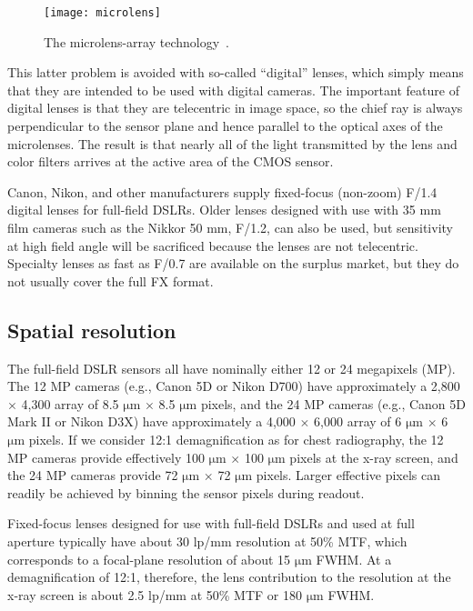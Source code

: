 \begin{figure}[h]
\centering
\texttt{[image: microlens]}
\caption{The microlens-array technology~\citep{microlensfig}.}
\label{fig:microlensarray}
\end{figure}

This latter problem is avoided with so-called ``digital'' lenses, which simply means that they are intended to be used with digital cameras. The important feature of digital lenses is that they are telecentric in image space, so the chief ray is always perpendicular to the sensor plane and hence parallel to the optical axes of the microlenses. The result is that nearly all of the light transmitted by the lens and color filters arrives at the active area of the CMOS sensor. 

Canon, Nikon, and other manufacturers supply fixed-focus (non-zoom) F/1.4 digital lenses for full-field DSLRs. Older lenses designed with use with 35 mm film cameras such as the Nikkor 50 mm, F/1.2, can also be used, but sensitivity at high field angle will be sacrificed because the lenses are not telecentric. Specialty lenses as fast as F/0.7 are available on the surplus market, but they do not usually cover the full FX format.

\subsection{Spatial resolution}
\label{subsect:spatial_resolution}
The full-field DSLR sensors all have nominally either 12 or 24 megapixels (MP). The 12 MP cameras (e.g., Canon 5D or Nikon D700) have approximately a 2,800 $\times$ 4,300 array of 8.5 $\mathrm{\mu m}$ $\times$ 8.5 $\mathrm{\mu m}$ pixels, and the 24 MP cameras (e.g., Canon 5D Mark II or Nikon D3X) have approximately a 4,000 $\times$ 6,000 array of 6 $\mathrm{\mu m}$ $\times$ 6 $\mathrm{\mu m}$ pixels. If we consider 12:1 demagnification as for chest radiography, the 12 MP cameras provide effectively 100 $\mathrm{\mu m}$ $\times$ 100 $\mathrm{\mu m}$ pixels at the x-ray screen, and the 24 MP cameras provide 72 $\mathrm{\mu m}$ $\times$ 72 $\mathrm{\mu m}$ pixels. Larger effective pixels can readily be achieved by binning the sensor pixels during readout.

Fixed-focus lenses designed for use with full-field DSLRs and used at full aperture typically have about 30 lp/mm resolution at 50\% MTF, which corresponds to a focal-plane resolution of about 15 $\mathrm{\mu m}$ FWHM. At a demagnification of 12:1, therefore, the lens contribution to the resolution at the x-ray screen is about 2.5 lp/mm at 50\% MTF or 180 $\mathrm{\mu m}$ FWHM.

